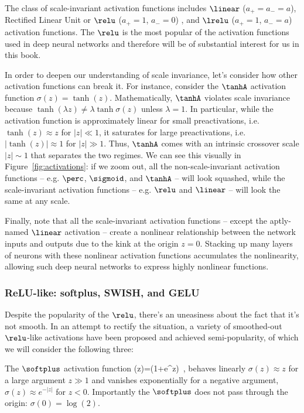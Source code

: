 The class of scale-invariant activation functions includes $\linear$ ($a_+=a_-=a$),
 Rectified Linear Unit or $\relu$ ($a_+=1$, $a_-=0$) 
 \cite{nair2010rectified,glorot2011deep},
and $\lrelu$ ($a_+=1$, $a_-=a$) \cite{maas2013rectifier} activation functions.
The $\relu$ is the most popular of the activation functions used in deep neural networks and therefore will be of substantial interest for us in this book.

In order to deepen our understanding of scale invariance, let's consider how other activation functions can break it. For instance, consider the $\tanhA$ activation function $\sigma(z) = \tanh(z)$. Mathematically, $\tanhA$ violates scale invariance because $\tanh(\lambda z) \ne\lambda \tanh \sigma(z)$ unless $\lambda=1$. In particular, while the activation function is approximately linear for small preactivations, i.e.~$\tanh(z)\approx z$ for  $\vert z\vert\ll 1$, it saturates for large preactivations, i.e.~$\vert\tanh(z)\vert\approx 1$ for $|z| \gg 1$. Thus, $\tanhA$ comes with an intrinsic crossover scale $\vert z\vert\sim1$ that separates the two regimes.
We can see this visually in Figure~\ref{fig:activations}: if we zoom out, all the non-scale-invariant activation functions -- e.g. $\perc$, $\sigmoid$, and $\tanhA$ -- will look squashed, while the scale-invariant activation functions -- e.g. $\relu$ and $\linear$ -- will look the same at any scale.

Finally, note that all the scale-invariant activation functions -- except the aptly-named $\linear$ activation -- create a nonlinear relationship between the network inputs and outputs due to the kink at the origin $z=0$. Stacking up many layers of neurons with these nonlinear activation functions accumulates the nonlinearity, allowing such deep neural networks to express highly nonlinear functions.


\subsubsection{ReLU-like: softplus, SWISH, and GELU}
Despite the popularity of the $\relu$, there's an uneasiness about the fact that it's not smooth. In an attempt to rectify the situation, a variety of smoothed-out $\relu$-like activations have been proposed and achieved semi-popularity, of which we will consider the following three:
\bi
\item  The $\softplus$ activation function \cite{dugas2000incorporating}
\be\label{eq:softplus}
\sigma(z)=\log\!\le(1+e^{z}\ri)\, ,
\ee
behaves linearly $\sigma(z) \approx z$  for a large argument $z\gg 1$ and vanishes exponentially for a negative argument, $\sigma(z) \approx e^{-\vert z\vert}$ for $z < 0$. Importantly
the $\softplus$ does not pass through the origin: $\sigma(0) = \log(2)$.

